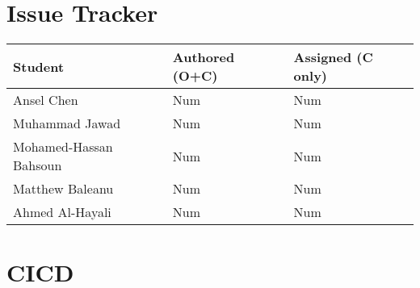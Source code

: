 \documentclass{article}
\begin{document}

\section{Issue Tracker}


\begin{table}[H]
\centering
\begin{tabular}{lll}
\toprule
\textbf{Student} & \textbf{Authored (O+C)} & \textbf{Assigned (C only)}\\
\midrule
Ansel Chen & Num & Num \\
Muhammad Jawad & Num & Num \\
Mohamed-Hassan Bahsoun & Num & Num \\
Matthew Baleanu & Num & Num \\
Ahmed Al-Hayali & Num & Num \\
\bottomrule
\end{tabular}
\end{table}


\section{CICD}


\end{document}
